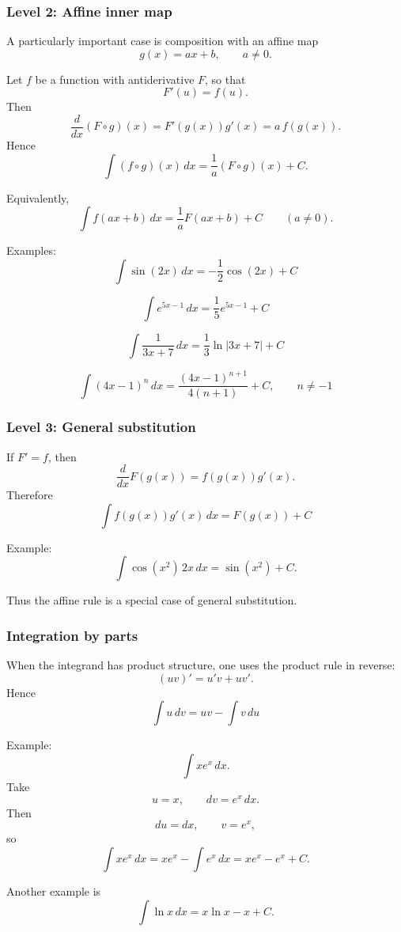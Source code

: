 \documentclass{article}
\begin{document}
	\subsubsection{Level 2: Affine inner map}
	
	A particularly important case is composition with an affine map
	\[
	g(x)=ax+b,
	\qquad a\neq 0.
	\]
	
	Let \(f\) be a function with antiderivative \(F\), so that
	\[
	F'(u)=f(u).
	\]
	Then
	\[
	\frac{d}{dx}(F\circ g)(x)
	=
	F'(g(x))g'(x)
	=
	a\,f(g(x)).
	\]
	Hence
	\[
	\int (f\circ g)(x)\,dx
	=
	\frac{1}{a}(F\circ g)(x)+C.
	\]
	
	Equivalently,
	\[
	\boxed{
		\int f(ax+b)\,dx
		=
		\frac{1}{a}F(ax+b)+C
	}
	\qquad (a\neq 0).
	\]
	
	Examples:
	\[
	\int \sin(2x)\,dx
	=
	-\frac{1}{2}\cos(2x)+C
	\]
	
	\[
	\int e^{5x-1}\,dx
	=
	\frac{1}{5}e^{5x-1}+C
	\]
	
	\[
	\int \frac{1}{3x+7}\,dx
	=
	\frac{1}{3}\ln|3x+7|+C
	\]
	
	\[
	\int (4x-1)^n\,dx
	=
	\frac{(4x-1)^{n+1}}{4(n+1)}+C,
	\qquad n\neq -1
	\]
	
	\subsubsection{Level 3: General substitution}
	
	If \(F'=f\), then
	\[
	\frac{d}{dx}F(g(x))
	=
	f(g(x))g'(x).
	\]
	Therefore
	\[
	\boxed{
		\int f(g(x))g'(x)\,dx
		=
		F(g(x))+C
	}
	\]
	
	Example:
	\[
	\int \cos(x^2)\,2x\,dx
	=
	\sin(x^2)+C.
	\]
	
	Thus the affine rule is a special case of general substitution.
	
	\subsubsection{Integration by parts}
	
	When the integrand has product structure, one uses the product rule in reverse:
	\[
	(uv)'=u'v+uv'.
	\]
	Hence
	\[
	\boxed{
		\int u\,dv = uv-\int v\,du
	}
	\]
	
	Example:
	\[
	\int xe^x\,dx.
	\]
	Take
	\[
	u=x,\qquad dv=e^x\,dx.
	\]
	Then
	\[
	du=dx,\qquad v=e^x,
	\]
	so
	\[
	\int xe^x\,dx
	=
	xe^x-\int e^x\,dx
	=
	xe^x-e^x+C.
	\]
	
	Another example is
	\[
	\int \ln x\,dx
	=
	x\ln x-x+C.
	\]
	
\end{document}
